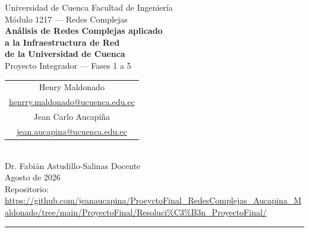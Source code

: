 \documentclass[12pt, a4paper]{article}
\newcommand{\autorsep}{\quad\textperiodcentered\quad}
\begin{document}
\thispagestyle{empty}

\begin{center}
    \vspace*{1cm}
    {\small Universidad de Cuenca \autorsep Facultad de Ingeniería}\\[0.4em]
    {\small Módulo 1217 --- Redes Complejas}\\[2em]

    {\LARGE\bfseries\color{azulsec}
        Análisis de Redes Complejas aplicado\\[0.3em]
        a la Infraestructura de Red\\[0.3em]
        de la Universidad de Cuenca%
    }\\[1.2em]

    {\large Proyecto Integrador --- Fases 1 a 5}\\[2em]

    \small
\begin{tabular}{c}
        Henry Maldonado\\
        {\small \href{mailto:henrry.maldonado@ucuenca.edu.ec}{henrry.maldonado@ucuenca.edu.ec}}\\[0.8em]
        Jean Carlo Aucapi\~{n}a\\
        {\small \href{mailto:jean.aucapina@ucuenca.edu.ec}{jean.aucapina@ucuenca.edu.ec}}\\
    \end{tabular}\\[2em]

    {\small Dr. Fabián Astudillo-Salinas \autorsep Docente}\\[0.5em]
    {\small Agosto de 2026}\\[1.5em]

    {\small Repositorio:
        \url{https://github.com/jeanaucapina/ProeyctoFinal_RedesComplejas_Aucapina_Maldonado/tree/main/ProyectoFinal/Resoluci%C3%B3n_ProyectoFinal/} %
    }

    \vspace{2cm}
    \color{azulsec}\rule{0.6\linewidth}{1pt}
\end{center}

\newpage
\setcounter{page}{1}
\end{document}
